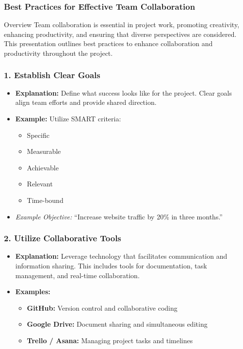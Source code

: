 \documentclass[aspectratio=169]{beamer}
\begin{document}
\begin{frame}[fragile]
    \frametitle{Best Practices for Effective Team Collaboration}
    \begin{block}{Overview}
        Team collaboration is essential in project work, promoting creativity, enhancing productivity, and ensuring that diverse perspectives are considered. 
        This presentation outlines best practices to enhance collaboration and productivity throughout the project.
    \end{block}
\end{frame}

\begin{frame}[fragile]
    \frametitle{1. Establish Clear Goals}
    \begin{itemize}
        \item \textbf{Explanation:} Define what success looks like for the project. Clear goals align team efforts and provide shared direction.
        \item \textbf{Example:} Utilize SMART criteria:
        \begin{itemize}
            \item Specific
            \item Measurable
            \item Achievable
            \item Relevant
            \item Time-bound
        \end{itemize}
        \item \textit{Example Objective:} ``Increase website traffic by 20\% in three months.''
    \end{itemize}
\end{frame}

\begin{frame}[fragile]
    \frametitle{2. Utilize Collaborative Tools}
    \begin{itemize}
        \item \textbf{Explanation:} Leverage technology that facilitates communication and information sharing. This includes tools for documentation, task management, and real-time collaboration.
        \item \textbf{Examples:}
        \begin{itemize}
            \item \textbf{GitHub:} Version control and collaborative coding
            \item \textbf{Google Drive:} Document sharing and simultaneous editing
            \item \textbf{Trello / Asana:} Managing project tasks and timelines
        \end{itemize}
    \end{itemize}
\end{frame}
\end{document}
